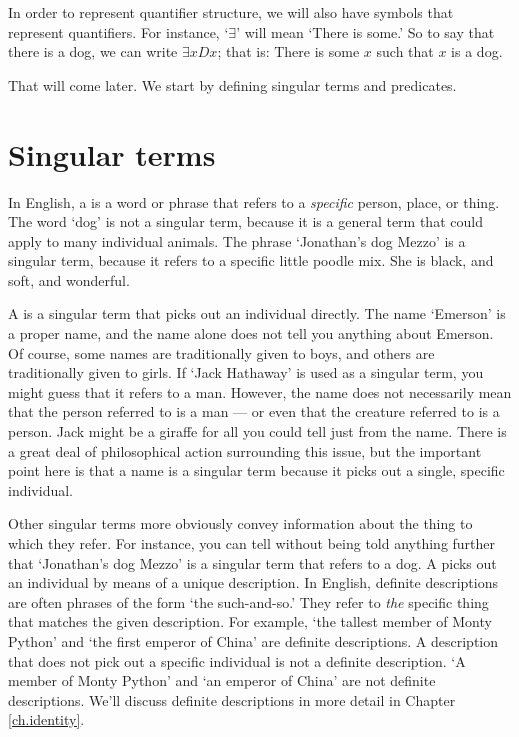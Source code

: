 In order to represent quantifier structure, we will also have symbols that represent quantifiers. For instance, `$\exists$' will mean `There is some\blank.' So to say that there is a dog, we can write $\exists x Dx$; that is: There is some $x$ such that $x$ is a dog.

That will come later. We start by defining singular terms and predicates.


\section{Singular terms}
In English, a  is a word or phrase that refers to a \emph{specific} person, place, or thing. The word `dog' is not a singular term, because it is a general term that could apply to many individual animals. The phrase `Jonathan's dog Mezzo' is a singular term, because it refers to a specific little poodle mix. She is black, and soft, and wonderful.

A  is a singular term that picks out an individual directly. The name `Emerson' is a proper name, and the name alone does not tell you anything about Emerson. Of course, some names are traditionally given to boys, and others are traditionally given to girls. If `Jack Hathaway' is used as a singular term, you might guess that it refers to a man. However, the name does not necessarily mean that the person referred to is a man --- or even that the creature referred to is a person. Jack might be a giraffe for all you could tell just from the name. There is a great deal of philosophical action surrounding this issue, but the important point here is that a name is a singular term because it picks out a single, specific individual.

Other singular terms more obviously convey information about the thing to which they refer. For instance, you can tell without being told anything further that `Jonathan's dog Mezzo' is a singular term that refers to a dog. A  picks out an individual by means of a unique description. In English, definite descriptions are often phrases of the form `the such-and-so.' They refer to \emph{the} specific thing that matches the given description. For example, `the tallest member of Monty Python' and `the first emperor of China' are definite descriptions. A description that does not pick out a specific individual is not a definite description. `A member of Monty Python' and `an emperor of China' are not definite descriptions. We'll discuss definite descriptions in more detail in Chapter \ref{ch.identity}.

